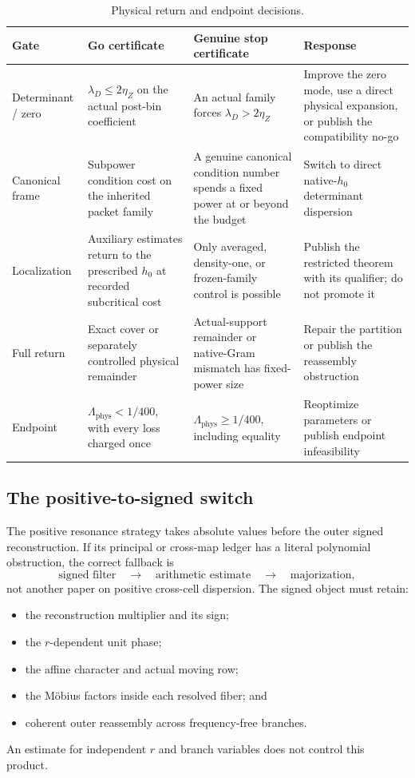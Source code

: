 \begin{table}[ht]
\centering
\scriptsize
\begin{tabularx}{\textwidth}{@{}
  >{\raggedright\arraybackslash}p{1.8cm}Y Y Y@{}}
\toprule
Gate & Go certificate & Genuine stop certificate & Response\\
\midrule
Determinant / zero &
\(\lambda_D\le2\eta_Z\) on the actual post-bin coefficient &
An actual family forces \(\lambda_D>2\eta_Z\) &
Improve the zero mode, use a direct physical expansion, or publish
the compatibility no-go\\

Canonical frame &
Subpower condition cost on the inherited packet family &
A genuine canonical condition number spends a fixed power at or
beyond the budget &
Switch to direct native-\(h_0\) determinant dispersion\\

Localization &
Auxiliary estimates return to the prescribed \(h_0\) at recorded
subcritical cost &
Only averaged, density-one, or frozen-family control is possible &
Publish the restricted theorem with its qualifier; do not promote it\\

Full return &
Exact cover or separately controlled physical remainder &
Actual-support remainder or native-Gram mismatch has fixed-power
size &
Repair the partition or publish the reassembly obstruction\\

Endpoint &
\(\Lambda_{\mathrm{phys}}<1/400\), with every loss charged once &
\(\Lambda_{\mathrm{phys}}\ge1/400\), including equality &
Reoptimize parameters or publish endpoint infeasibility\\
\bottomrule
\end{tabularx}
\caption{Physical return and endpoint decisions.}
\label{tab:stop-global}
\end{table}

\subsection{The positive-to-signed switch}

The positive resonance strategy takes absolute values before the
outer signed reconstruction.  If its principal or cross-map ledger
has a literal polynomial obstruction, the correct fallback is
\[
\text{signed filter}\quad\longrightarrow\quad
\text{arithmetic estimate}\quad\longrightarrow\quad
\text{majorization},
\]
not another paper on positive cross-cell dispersion.  The signed
object must retain:
\begin{itemize}[leftmargin=2em]
\item the reconstruction multiplier and its sign;
\item the \(r\)-dependent unit phase;
\item the affine character and actual moving row;
\item the M\"obius factors inside each resolved fiber; and
\item coherent outer reassembly across frequency-free branches.
\end{itemize}
An estimate for independent \(r\) and branch variables does not
control this product.

